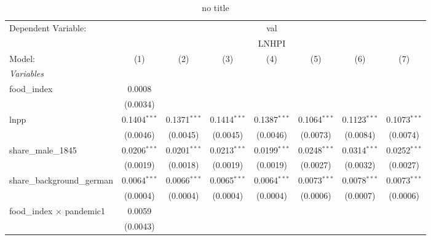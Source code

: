 
\begin{table}[htbp]
   \caption{no title}
   \centering
   \begin{tabular}{lccccccc}
      \tabularnewline \midrule \midrule
      Dependent Variable: & \multicolumn{7}{c}{val}\\
       & \multicolumn{7}{c}{LNHPI} \\ 
      Model:                                     & (1)            & (2)            & (3)            & (4)            & (5)            & (6)            & (7)\\  
      \midrule
      \emph{Variables}\\
      food\_index                                & 0.0008         &                &                &                &                &                &   \\   
                                                 & (0.0034)       &                &                &                &                &                &   \\   
      lnpp                                       & 0.1404$^{***}$ & 0.1371$^{***}$ & 0.1414$^{***}$ & 0.1387$^{***}$ & 0.1064$^{***}$ & 0.1123$^{***}$ & 0.1073$^{***}$\\   
                                                 & (0.0046)       & (0.0045)       & (0.0045)       & (0.0046)       & (0.0073)       & (0.0084)       & (0.0074)\\   
      share\_male\_1845                          & 0.0206$^{***}$ & 0.0201$^{***}$ & 0.0213$^{***}$ & 0.0199$^{***}$ & 0.0248$^{***}$ & 0.0314$^{***}$ & 0.0252$^{***}$\\   
                                                 & (0.0019)       & (0.0018)       & (0.0019)       & (0.0019)       & (0.0027)       & (0.0032)       & (0.0027)\\   
      share\_background\_german                  & 0.0064$^{***}$ & 0.0066$^{***}$ & 0.0065$^{***}$ & 0.0064$^{***}$ & 0.0073$^{***}$ & 0.0078$^{***}$ & 0.0073$^{***}$\\   
                                                 & (0.0004)       & (0.0004)       & (0.0004)       & (0.0004)       & (0.0006)       & (0.0007)       & (0.0006)\\   
      food\_index $\times$ pandemic1             & 0.0059         &                &                &                &                &                &   \\   
                                                 & (0.0043)       &                &                &                &                &                &   \\   

\end{tabular}
\end{table}
